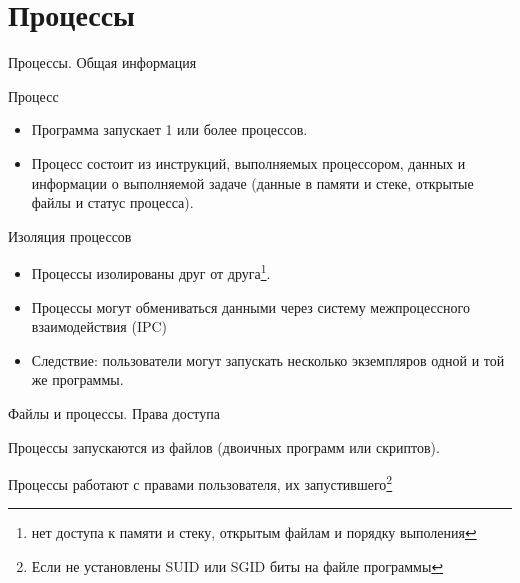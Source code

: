   \lstset{basicstyle=\tiny}



\firstframe

\section{Процессы}

\begin{frame}{Процессы. Общая информация}
  \begin{block}{Процесс}
    \begin{itemize}
      \item Программа запускает 1 или более процессов. 
      \item Процесс состоит из инструкций, выполняемых процессором, данных и информации о выполняемой задаче (данные в памяти и стеке, открытые файлы и статус процесса).
    \end{itemize} 
  \end{block} \pause

  \begin{block}{Изоляция процессов}
    \begin{itemize}
      \item Процессы изолированы друг от друга\footnote{нет доступа к памяти и стеку, открытым файлам и порядку выполения}.
      \item Процессы могут обмениваться данными через систему межпроцессного взаимодействия (IPC)
      \item Следствие: пользователи могут запускать несколько экземпляров одной и той же программы. 
    \end{itemize}
  \end{block}

\end{frame}

\begin{frame}{Файлы и процессы. Права доступа}

  Процессы запускаются из файлов (двоичных программ или скриптов).

  Процессы работают с правами пользователя, их запустившего\footnote{Если не установлены SUID или SGID биты на файле программы}

\end{frame}

